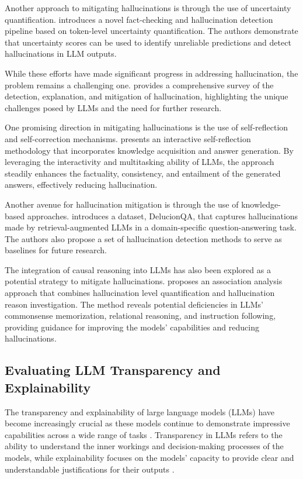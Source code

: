 \documentclass[11pt]{article}
\begin{document}
Another approach to mitigating hallucinations is through the use of uncertainty quantification. \cite{ref173} introduces a novel fact-checking and hallucination detection pipeline based on token-level uncertainty quantification. The authors demonstrate that uncertainty scores can be used to identify unreliable predictions and detect hallucinations in LLM outputs.

While these efforts have made significant progress in addressing hallucination, the problem remains a challenging one. \cite{ref174} provides a comprehensive survey of the detection, explanation, and mitigation of hallucination, highlighting the unique challenges posed by LLMs and the need for further research.

One promising direction in mitigating hallucinations is the use of self-reflection and self-correction mechanisms. \cite{ref175} presents an interactive self-reflection methodology that incorporates knowledge acquisition and answer generation. By leveraging the interactivity and multitasking ability of LLMs, the approach steadily enhances the factuality, consistency, and entailment of the generated answers, effectively reducing hallucination.

Another avenue for hallucination mitigation is through the use of knowledge-based approaches. \cite{ref176} introduces a dataset, DelucionQA, that captures hallucinations made by retrieval-augmented LLMs in a domain-specific question-answering task. The authors also propose a set of hallucination detection methods to serve as baselines for future research.

The integration of causal reasoning into LLMs has also been explored as a potential strategy to mitigate hallucinations. \cite{ref177} proposes an association analysis approach that combines hallucination level quantification and hallucination reason investigation. The method reveals potential deficiencies in LLMs' commonsense memorization, relational reasoning, and instruction following, providing guidance for improving the models' capabilities and reducing hallucinations.

\subsection{Evaluating LLM Transparency and Explainability}

The transparency and explainability of large language models (LLMs) have become increasingly crucial as these models continue to demonstrate impressive capabilities across a wide range of tasks \cite{ref28,ref178}. Transparency in LLMs refers to the ability to understand the inner workings and decision-making processes of the models, while explainability focuses on the models' capacity to provide clear and understandable justifications for their outputs \cite{ref179}.
\end{document}
